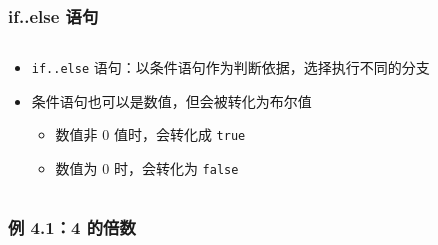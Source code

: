 \begin{frame}[fragile]
    \frametitle{if..else 语句}

    \begin{columns}
        \begin{overlayarea}{\textwidth}{.6\textheight}
            \begin{itemize}
                \item \lstinline|if..else| 语句：以条件语句作为判断依据，选择执行不同的分支

                \item 条件语句也可以是数值，但会被转化为布尔值

                    \begin{itemize}
                        \item<2-> 数值非 $0$ 值时，会转化成 \lstinline|true|
                        \item<3-> 数值为 $0$ 时，会转化为 \lstinline|false|
                    \end{itemize}

            \end{itemize}
        \end{overlayarea}

        \begin{overlayarea}{\textwidth}{.3\textheight}
            
        \end{overlayarea}
    \end{columns}
\end{frame}

\begin{frame}[fragile]
    \frametitle{例 4.1：4 的倍数}

\end{frame}

